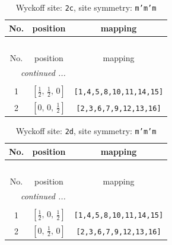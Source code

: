 \documentclass[fleqn,8pt]{jsarticle}
\begin{document}
\renewcommand{\arraystretch}{1.2}
\begin{longtable}{ccc}
\caption{Wyckoff site: {\tt 2c}, site symmetry: {\tt m'm'm}}
 \\
 \hline \hline
No. & position & mapping \\ \hline \endfirsthead

\multicolumn{2}{l}{\tablename\ \thetable{}} \\
 \hline \hline
No. & position & mapping \\ \hline \endhead

 \hline \hline
\multicolumn{2}{r}{\footnotesize\it continued ...} \\ \endfoot

 \hline \hline
\multicolumn{2}{r}{} \\ \endlastfoot

1 & $\left[ \frac{1}{2},\, \frac{1}{2},\, 0 \right]$ & {\tt [1,4,5,8,10,11,14,15]} \\ \hline
2 & $\left[ 0,\, 0,\, \frac{1}{2} \right]$ & {\tt [2,3,6,7,9,12,13,16]} \\
\end{longtable}
\renewcommand{\arraystretch}{1.2}
\begin{longtable}{ccc}
\caption{Wyckoff site: {\tt 2d}, site symmetry: {\tt m'm'm}}
 \\
 \hline \hline
No. & position & mapping \\ \hline \endfirsthead

\multicolumn{2}{l}{\tablename\ \thetable{}} \\
 \hline \hline
No. & position & mapping \\ \hline \endhead

 \hline \hline
\multicolumn{2}{r}{\footnotesize\it continued ...} \\ \endfoot

 \hline \hline
\multicolumn{2}{r}{} \\ \endlastfoot

1 & $\left[ \frac{1}{2},\, 0,\, \frac{1}{2} \right]$ & {\tt [1,4,5,8,10,11,14,15]} \\ \hline
2 & $\left[ 0,\, \frac{1}{2},\, 0 \right]$ & {\tt [2,3,6,7,9,12,13,16]} \\
\end{longtable}
\renewcommand{\arraystretch}{1.2}
\end{document}
